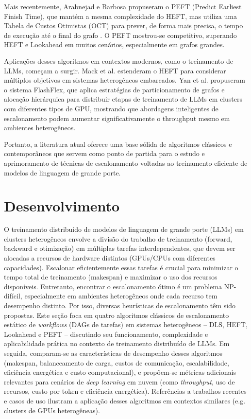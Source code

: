 \documentclass[12pt, %
openright, 
oneside, %
a4paper,    %
brazil]{facom-ufu-abntex2}
\begin{document}
Mais recentemente, Arabnejad e Barbosa propuseram o PEFT (Predict Earliest Finish Time), que mantém a mesma complexidade do HEFT, mas utiliza uma Tabela de Custos Otimistas (OCT) para prever, de forma mais precisa, o tempo de execução até o final do grafo \cite{arabnejad2013list}. O PEFT mostrou-se competitivo, superando HEFT e Lookahead em muitos cenários, especialmente em grafos grandes.

Aplicações desses algoritmos em contextos modernos, como o treinamento de LLMs, começam a surgir. Mack et al. \cite{mack2021performant} estenderam o HEFT para considerar múltiplos objetivos em sistemas heterogêneos embarcados. Yan et al. \cite{yan2024flashflex} propuseram o sistema FlashFlex, que aplica estratégias de particionamento de grafos e alocação hierárquica para distribuir etapas de treinamento de LLMs em clusters com diferentes tipos de GPU, mostrando que abordagens inteligentes de escalonamento podem aumentar significativamente o throughput mesmo em ambientes heterogêneos.

Portanto, a literatura atual oferece uma base sólida de algoritmos clássicos e contemporâneos que servem como ponto de partida para o estudo e aprimoramento de técnicas de escalonamento voltadas ao treinamento eficiente de modelos de linguagem de grande porte.


\chapter{Desenvolvimento}
O treinamento distribuído de modelos de linguagem de grande porte (LLMs) em clusters heterogêneos envolve a divisão do trabalho de treinamento (forward, backward e otimização) em múltiplas tarefas interdependentes, que devem ser alocadas a recursos de hardware distintos (GPUs/CPUs com diferentes capacidades). Escalonar eficientemente essas tarefas é crucial para minimizar o tempo total de treinamento (makespan) e maximizar o uso dos recursos disponíveis. Entretanto, encontrar o escalonamento ótimo é um problema NP-difícil, especialmente em ambientes heterogêneos onde cada recurso tem desempenho distinto. Por isso, diversas heurísticas de escalonamento têm sido propostas. Este seção foca em quatro algoritmos clássicos de escalonamento estático de \textit{workflows} (DAGs de tarefas) em sistemas heterogêneos – DLS, HEFT, Lookahead e PEFT – discutindo seu funcionamento, complexidade e aplicabilidade prática no contexto de treinamento distribuído de LLMs. Em seguida, comparam-se as características de desempenho desses algoritmos (makespan, balanceamento de carga, custos de comunicação, escalabilidade, eficiência energética e custo computacional), e propõem-se métricas adicionais relevantes para cenários de \textit{deep learning} em nuvem (como \textit{throughput}, uso de recursos, custo por token e eficiência energética). Referências a trabalhos recentes e casos de uso ilustram a aplicação desses algoritmos em contextos similares (e.g. clusters de GPUs heterogêneas).
\end{document}
